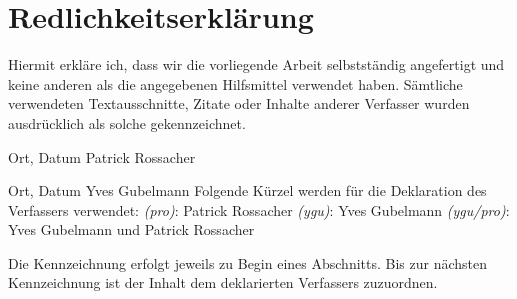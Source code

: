 \newpage
\section*{Redlichkeitserklärung}

Hiermit erkläre ich, dass wir die vorliegende Arbeit selbstständig angefertigt und keine anderen als die angegebenen Hilfsmittel verwendet haben. Sämtliche verwendeten Textausschnitte, Zitate oder Inhalte anderer Verfasser wurden ausdrücklich als solche gekennzeichnet. 
\vspace{2cm}

\textemdash\textemdash\textemdash\textemdash\textemdash\textemdash
\textemdash\textemdash\textemdash\textemdash\textemdash\textemdash
\hspace{2.2cm}
\textemdash\textemdash\textemdash\textemdash\textemdash\textemdash
\textemdash\textemdash\textemdash\textemdash\textemdash\textemdash
\textemdash\textemdash\textemdash\textemdash\textemdash\textemdash
\newline
Ort, Datum 
\hspace{5cm} 
Patrick Rossacher

\vspace{2cm}

\textemdash\textemdash\textemdash\textemdash\textemdash\textemdash
\textemdash\textemdash\textemdash\textemdash\textemdash\textemdash
\hspace{2.2cm}
\textemdash\textemdash\textemdash\textemdash\textemdash\textemdash
\textemdash\textemdash\textemdash\textemdash\textemdash\textemdash
\textemdash\textemdash\textemdash\textemdash\textemdash\textemdash
\newline
Ort, Datum 
\hspace{5cm} 
Yves Gubelmann
\vfill
Folgende Kürzel werden für die Deklaration des Verfassers verwendet:
\newline
\textit{(pro)}: Patrick Rossacher
\newline
\textit{(ygu)}: Yves Gubelmann
\newline
\textit{(ygu/pro)}: Yves Gubelmann und Patrick Rossacher
\newline

Die Kennzeichnung erfolgt jeweils zu Begin eines Abschnitts. Bis zur nächsten Kennzeichnung ist der Inhalt dem deklarierten Verfassers zuzuordnen.

